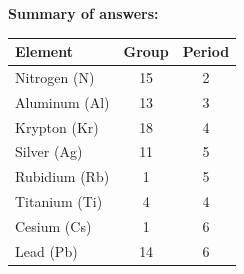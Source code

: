 \begin{exercise}
\begin{solu}
        \textbf{Summary of answers:}
        \begin{center}
            \begin{tabular}{@{}lcc@{}}
                \toprule
                \textbf{Element} & \textbf{Group} & \textbf{Period} \\
                \midrule
                Nitrogen (N) & 15 & 2 \\[3pt]
                Aluminum (Al) & 13 & 3 \\[3pt]
                Krypton (Kr) & 18 & 4 \\[3pt]
                Silver (Ag) & 11 & 5 \\[3pt]
                Rubidium (Rb) & 1 & 5 \\[3pt]
                Titanium (Ti) & 4 & 4 \\[3pt]
                Cesium (Cs) & 1 & 6 \\[3pt]
                Lead (Pb) & 14 & 6 \\
                \bottomrule
            \end{tabular}
        \end{center}
    \end{solu}
\end{exercise}
